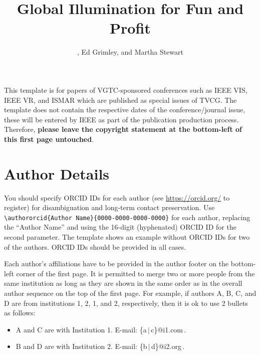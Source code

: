 \documentclass[journal]{vgtc}                     %
\title{Global Illumination for Fun and Profit}
\author{%
  \authororcid{Josiah S.\ Carberry}{0000-0002-1825-0097},
  Ed Grimley, and
  Martha Stewart
}
\begin{document}


\maketitle


This template is for papers of VGTC-sponsored conferences such as IEEE VIS, IEEE VR, and ISMAR which are published as special issues of TVCG.
The template does not contain the respective dates of the conference/journal issue, these will be entered by IEEE as part of the publication production process.
Therefore, \textbf{please leave the copyright statement at the bottom-left of this first page untouched}.


\section{Author Details}

You should specify ORCID IDs for each author (see \url{https://orcid.org/}  to register) for disambiguation and long-term contact preservation.
Use \verb|\authororcid{Author Name}{0000-0000-0000-0000}| for each author, replacing the ``Author Name'' and using the 16-digit (hyphenated) ORCID ID for the second parameter.
The template shows an example without ORCID IDs for two of the authors.
ORCID IDs should be provided in all cases.

Each author's affiliations have to be provided in the author footer on the bottom-left corner of the first page.
It is permitted to merge two or more people from the same institution as long as they are shown in the same order as in the overall author sequence on the top of the first page.
For example, if authors A, B, C, and D are from institutions 1, 2, 1, and 2, respectively, then it is ok to use 2 bullets as follows:
\begin{itemize}
  \item A and C are with Institution 1. E-mail: \{a\,$|$\,c\}@i1.com\,.

  \item B and D are with Institution 2. E-mail: \{b\,$|$\,d\}@i2.org\,.
\end{itemize}
\end{document}
